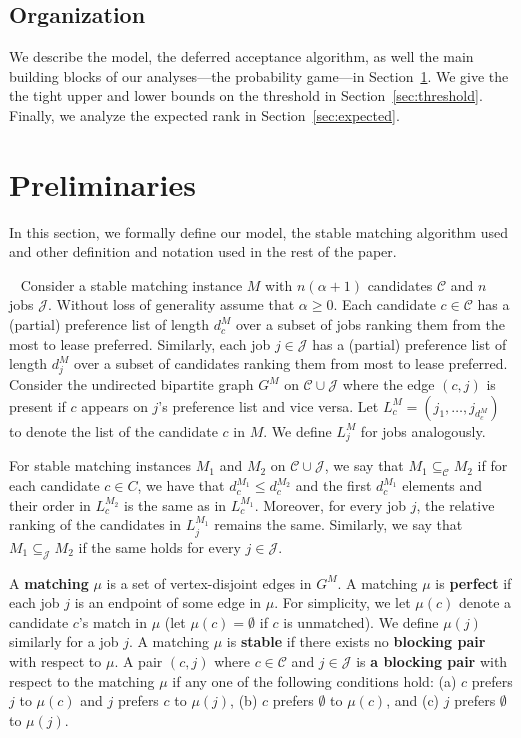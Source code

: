 \documentclass[11pt]{amsart}
\newcommand{\pparagraph}[1]{
\vspace{0.13in}\noindent{\textbf{\boldmath #1}}~}
\newcommand{\defn}{\textbf}
\begin{document}
\subsection{Organization} We describe the model, the deferred acceptance algorithm, as well the main building blocks of our analyses---the probability game---in Section~\ref{sec:prelim}.
We give the the tight upper and lower bounds on the threshold in Section~\ref{sec:threshold}.  Finally, we analyze the expected rank in Section~\ref{sec:expected}.  











 \section{Preliminaries}\label{sec:prelim}

In this section, we formally define our model, the stable matching algorithm used and other definition and notation used in the rest of the paper.

\pparagraph{Stable matchings.}  Consider a stable matching instance $M$ with $n(\alpha+1)$ candidates $\mathcal{C}$ and $n$ jobs $\mathcal{J}$. Without loss of generality assume that $\alpha \geq 0$. Each candidate $c \in \mathcal{C}$ has a (partial) preference list of length $d_c^M$ over a subset of jobs ranking them from the most to lease preferred.  Similarly, each job $j \in \mathcal{J}$ has a (partial) preference list of length $d_j^M$ over a subset of candidates ranking them from most to lease preferred. Consider the undirected bipartite graph $G^M$ on $\mathcal{C} \cup \mathcal{J}$ where the edge $(c, j)$ is present if $c$ appears on $j$'s preference list and vice versa. Let $L_c^M= (j_1,\ldots,j_{d_c^M})$ to denote the list of the candidate $c$ in $M$. We define $L_j^M$ for jobs analogously. 

For stable matching instances $M_1$ and $M_2$ on $\mathcal{C} \cup \mathcal{J}$, we say that $M_1 \subseteq_{\mathcal{C}}M_2$ if for each candidate $c \in C$, we have that $d_{c}^{M_1} \leq d_c^{M_2}$ and the first $d_{c}^{M_1}$ elements and their order in $L_c^{M_2}$ is the same as in $L_c^{M_1}$. Moreover, for every job $j$, the relative ranking of the candidates in $L_j^{M_1}$ remains the same. Similarly, we say that $M_1\subseteq_{\mathcal{J}}M_2$ if the same holds for every $j \in \mathcal{J}$.

A \defn{matching} $\mu$ is a set of vertex-disjoint edges in $G^M$.  A matching $\mu$ is \defn{perfect} if each job $j$ is an endpoint of some edge in $\mu$.
For simplicity, we let $\mu(c)$ denote a candidate $c$'s match in $\mu$ (let $\mu(c) = \emptyset$ if $c$ is unmatched).  We define $\mu(j)$ similarly for a job $j$.
A matching $\mu$ is \defn{stable} if there exists no \defn{blocking pair} with respect to $\mu$.  A pair $(c, j)$ where $c \in \mathcal{C}$ and $j \in \mathcal{J}$ is \defn{a blocking pair} with respect to the matching $\mu$ if any one of the following conditions hold:  (a) $c$ prefers $j$ to $\mu(c)$  and $j$ prefers $c$ to $\mu(j)$, (b) $c$ prefers $\emptyset$ to $\mu(c)$, and (c)  $j$ prefers $\emptyset$ to $\mu(j)$.
\end{document}
